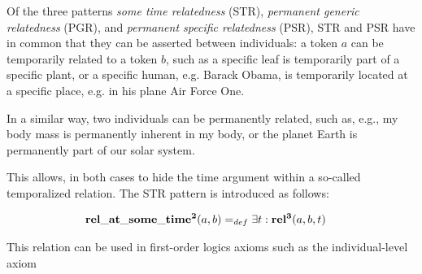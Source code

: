 
Of the three patterns \emph{some time relatedness} (STR), \emph{permanent generic relatedness} (PGR), and \emph{permanent specific relatedness} (PSR), STR and PSR have in common that they can be asserted between individuals: a token $a$ can be temporarily related to a token $b$, such as a specific leaf is temporarily part of a specific plant, or a specific human, e.g. Barack Obama, is temporarily located at a specific place, e.g. in his plane Air Force One.

In a similar way, two individuals can be permanently related, such as, e.g., my body mass is permanently inherent in my body, or the planet Earth is permanently part of our solar system.

This allows, in both cases to hide the time argument within a so-called temporalized relation.
The STR pattern is introduced as follows:  

\begin{equation}
\begin{split}
\mathrm{\mathbf{rel\_at\_some\_time^2}} (a,b) =_{def}&\; \exists t: \mathrm{\mathbf{rel^3}}(a,b,t)  
\end{split}
\label{eq:temporarily:ind}
\end{equation}

This relation can be used in first-order logics axioms such as the individual-level axiom

